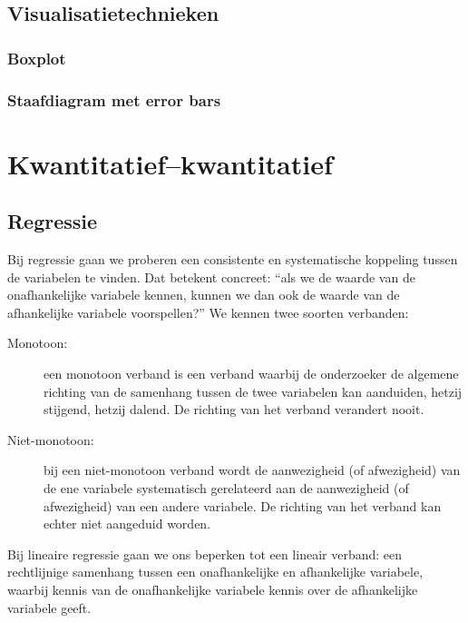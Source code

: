 \subsection{Visualisatietechnieken}
\label{ssec:kwal-kwant-visualisatie}

\subsubsection{Boxplot}


\subsubsection{Staafdiagram met error bars}


\section{Kwantitatief--kwantitatief}


\subsection{Regressie}
\label{sec:regressie}

Bij  regressie gaan we proberen een consistente en systematische koppeling tussen de variabelen te vinden. Dat betekent concreet: ``als we de waarde van de onafhankelijke variabele kennen, kunnen we dan ook de waarde van de afhankelijke variabele voorspellen?'' We kennen twee soorten verbanden:

\begin{description}
  \item [Monotoon:] een monotoon verband is een verband waarbij de onderzoeker de algemene richting van de samenhang tussen de twee variabelen kan aanduiden, hetzij stijgend, hetzij dalend. De richting van het verband verandert nooit.
  \item [Niet-monotoon:] bij een niet-monotoon verband wordt de aanwezigheid (of afwezigheid) van de ene variabele systematisch gerelateerd aan de aanwezigheid (of afwezigheid) van een andere variabele. De richting van het verband kan echter niet aangeduid worden.
\end{description}

Bij lineaire regressie gaan we ons beperken tot een lineair verband: een rechtlijnige samenhang tussen een onafhankelijke en afhankelijke variabele, waarbij kennis van de onafhankelijke variabele kennis over de afhankelijke variabele geeft.

